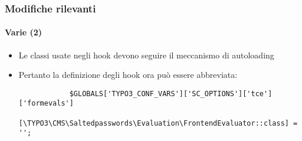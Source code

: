 \begin{frame}[fragile]
	\frametitle{Modifiche rilevanti}
	\framesubtitle{Varie (2)}

	\lstset{basicstyle=\tiny\ttfamily}

	\begin{itemize}

		\item Le classi usate negli hook devono seguire il meccanismo di autoloading
		\item Pertanto la definizione degli hook ora può essere abbreviata:

		\begin{lstlisting}
			$GLOBALS['TYPO3_CONF_VARS']['SC_OPTIONS']['tce']['formevals']
			  [\TYPO3\CMS\Saltedpasswords\Evaluation\FrontendEvaluator::class] = '';
		\end{lstlisting}

	\end{itemize}

	\breakingchange

\end{frame}

